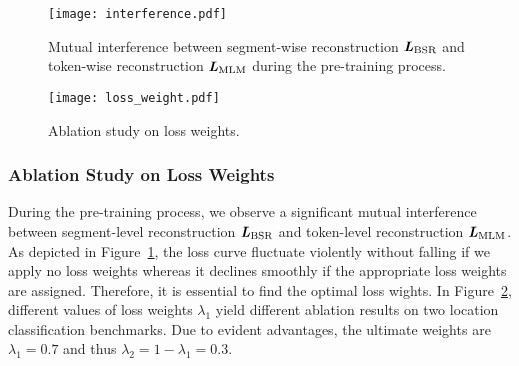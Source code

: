 \begin{table}[!ht]
    \caption{Ablation study on pre-training objectives.}
    \vspace{-1em}
    \label{Tab:ablation_loss}
    \begin{center}
    \vspace{-1em}
    \end{center}
\end{table}
\begin{figure}[t]
    \centering
    \texttt{[image: interference.pdf]}\vspace{-1em}
    \caption{Mutual interference between segment-wise reconstruction $\textbf{\textit{L}}_\text{BSR}$ and token-wise reconstruction $\textbf{\textit{L}}_\text{MLM}$ during the pre-training process.}
    \vspace{-1em}
    \label{Fig:interference}
\end{figure}
\begin{figure}[t]
    \centering
    \texttt{[image: loss\_weight.pdf]}\vspace{-1em}
    \caption{Ablation study on loss weights.}
    \vspace{-1em}
    \label{Fig:ablation_weights}
\end{figure}
\subsubsection{Ablation Study on Loss Weights}
During the pre-training process, we observe a significant mutual
interference between segment-level reconstruction $\textbf{\textit{L}}_\text{BSR}$ and token-level reconstruction $\textbf{\textit{L}}_\text{MLM}$. As depicted in Figure~\ref{Fig:interference}, the loss curve fluctuate violently without falling if we apply no loss weights whereas it declines smoothly if the appropriate loss weights are assigned. Therefore, it is essential to find the optimal loss wights.
In Figure~\ref{Fig:ablation_weights}, different values of loss weights $\lambda_1$ yield different ablation results on two location classification benchmarks. Due to evident advantages, the ultimate weights are $\lambda_1=0.7$ and thus $\lambda_2=1-\lambda_1=0.3$.

